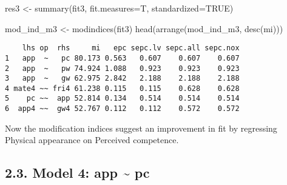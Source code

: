 \documentclass[
  letterpaper,
  DIV=11,
  numbers=noendperiod]{scrartcl}
\newenvironment{Shaded}{\begin{snugshade}}{\end{snugshade}}
\newcommand{\AttributeTok}[1]{\textcolor[rgb]{0.40,0.45,0.13}{#1}}
\newcommand{\ConstantTok}[1]{\textcolor[rgb]{0.56,0.35,0.01}{#1}}
\newcommand{\FunctionTok}[1]{\textcolor[rgb]{0.28,0.35,0.67}{#1}}
\newcommand{\NormalTok}[1]{\textcolor[rgb]{0.00,0.23,0.31}{#1}}
\newcommand{\OtherTok}[1]{\textcolor[rgb]{0.00,0.23,0.31}{#1}}
\begin{document}
\begin{Shaded}
\begin{Highlighting}[]
\NormalTok{res3 }\OtherTok{\textless{}{-}} \FunctionTok{summary}\NormalTok{(fit3, }\AttributeTok{fit.measures=}\NormalTok{T, }\AttributeTok{standardized=}\ConstantTok{TRUE}\NormalTok{)}

\NormalTok{mod\_ind\_m3 }\OtherTok{\textless{}{-}} \FunctionTok{modindices}\NormalTok{(fit3)}
\FunctionTok{head}\NormalTok{(}\FunctionTok{arrange}\NormalTok{(mod\_ind\_m3, }\FunctionTok{desc}\NormalTok{(mi)))}
\end{Highlighting}
\end{Shaded}

\begin{verbatim}
    lhs op  rhs     mi   epc sepc.lv sepc.all sepc.nox
1   app  ~   pc 80.173 0.563   0.607    0.607    0.607
2   app  ~   pw 74.924 1.088   0.923    0.923    0.923
3   app  ~   gw 62.975 2.842   2.188    2.188    2.188
4 mate4 ~~ fri4 61.238 0.115   0.115    0.628    0.628
5    pc ~~  app 52.814 0.134   0.514    0.514    0.514
6  app4 ~~  gw4 52.767 0.112   0.112    0.572    0.572
\end{verbatim}

Now the modification indices suggest an improvement in fit by regressing
Physical appearance on Perceived competence.

\subsection{2.3. Model 4: app \textasciitilde{}
pc}\label{model-4-app-pc}
\end{document}
